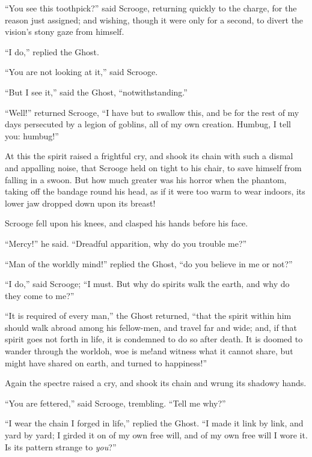\documentclass[paper=5.5in:8.5in,BCOR=5mm,twoside,DIV=calc,12pt,usegeometry]{scrbook} %
\begin{document}
\enquote{You see this toothpick?} said Scrooge, returning quickly to the charge, for the reason just assigned; and wishing, though it were only for a second, to divert the vision's stony gaze from himself.

\enquote{I do,} replied the Ghost.

\enquote{You are not looking at it,} said Scrooge.

\enquote{But I see it,} said the Ghost, \enquote{notwithstanding.}

\enquote{Well!} returned Scrooge, \enquote{I have but to swallow this, and be for the rest of my days persecuted by a legion of goblins, all of my own creation. Humbug, I tell you: humbug!}

At this the spirit raised a frightful cry, and shook its chain with such a dismal and appalling noise, that Scrooge held on tight to his chair, to save himself from falling in a swoon. But how much greater was his horror when the phantom, taking off the bandage round his head, as if it were too warm to wear indoors, its lower jaw dropped down upon its breast!

Scrooge fell upon his knees, and clasped his hands before his face.

\enquote{Mercy!} he said. \enquote{Dreadful apparition, why do you trouble me?}

\enquote{Man of the worldly mind!} replied the Ghost, \enquote{do you believe in me or not?}

\enquote{I do,} said Scrooge; \enquote{I must. But why do spirits walk the earth, and why do they come to me?}

\enquote{It is required of every man,} the Ghost returned, \enquote{that the spirit within him should walk abroad among his fellow-men, and travel far and wide; and, if that spirit goes not forth in life, it is condemned to do so after death. It is doomed to wander through the world\textemdash oh, woe is me!\textemdash and witness what it cannot share, but might have shared on earth, and turned to happiness!}

Again the spectre raised a cry, and shook its chain and wrung its shadowy hands.

\enquote{You are fettered,} said Scrooge, trembling. \enquote{Tell me why?}

\enquote{I wear the chain I forged in life,} replied the Ghost. \enquote{I made it link by link, and yard by yard; I girded it on of my own free will, and of my own free will I wore it. Is its pattern strange to \textit{you}?}
\end{document}
